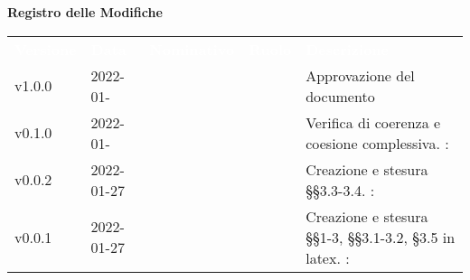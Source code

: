 

{\LARGE{\textbf{Registro delle Modifiche}}} \\
\begin{table}[!htbp]
\renewcommand{\arraystretch}{1.5}
\begin{tabular}{ m{}<{\centering}  m{}<{\centering}  m{}<{\centering}  m{}<{\centering}  m{}<{\centering} }
	\rowcolor{darkblue}
	\textcolor{white}{\textbf{Versione}} &\textcolor{white}{\textbf{Data}}& \textcolor{white}{\textbf{Nominativo}} & \textcolor{white}{\textbf{Ruolo}}&\textcolor{white}{\textbf{Descrizione}}\\ 

	v1.0.0 & 2022-01- & \ & \RE & Approvazione del documento \\

	\rowcolor{gray!25}v0.1.0& 2022-01- & \FP & \AN & Verifica di coerenza e coesione complessiva. \VE: \textit{}\\

	v0.0.2& 2022-01-27& \FP &\AN & Creazione e stesura \S\S{}3.3-3.4. \VE: \textit{}\\

	v0.0.1& 2022-01-27& \GC &\AN & Creazione e stesura \S\S{}1-3, \S\S{}3.1-3.2, \S3.5 in latex. \VE: \textit{}\\

\end{tabular}
\end{table}

\pagebreak